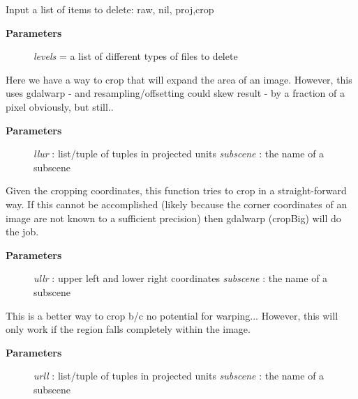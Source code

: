 \documentclass[letterpaper,10pt,english]{sphinxmanual}
\begin{document}
\begin{fulllineitems}
\begin{fulllineitems}
Input a list of items to delete: raw, nil, proj,crop
\begin{description}
\item[{\textbf{Parameters}}] \leavevmode
\emph{levels} = a list of different types of files to delete

\end{description}

\end{fulllineitems}


\begin{fulllineitems}
\label{code:Image.Image.cropBig}
Here we have a way to crop that will expand the area of an image.
However, this uses gdalwarp - and resampling/offsetting could skew result - by a fraction of a pixel obviously, but still..
\begin{description}
\item[{\textbf{Parameters}}] \leavevmode
\emph{llur}  : list/tuple of tuples in projected units
\emph{subscene} : the name of a subscene

\end{description}

\end{fulllineitems}


\begin{fulllineitems}
\label{code:Image.Image.cropImg}
Given the cropping coordinates, this function tries to crop in a straight-forward way.
If this cannot be accomplished (likely because the corner coordinates of an image are not known to a sufficient precision)
then gdalwarp (cropBig) will do the job.
\begin{description}
\item[{\textbf{Parameters}}] \leavevmode
\emph{ullr}  : upper left and lower right coordinates
\emph{subscene} : the name of a subscene

\end{description}

\end{fulllineitems}


\begin{fulllineitems}
\label{code:Image.Image.cropSmall}
This is a better way to crop b/c no potential for warping...
However, this will only work if the region falls completely within the image.
\begin{description}
\item[{\textbf{Parameters}}] \leavevmode
\emph{urll}  : list/tuple of tuples in projected units
\emph{subscene} : the name of a subscene


\end{description}
\end{fulllineitems}
\end{fulllineitems}
\end{document}
